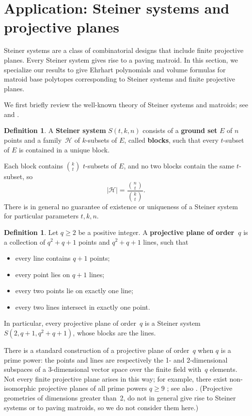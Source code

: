 \documentclass[11pt]{amsart}
\theoremstyle{definition}
\newtheorem{definition}[theorem]{Definition}
\newcommand{\0}{\emptyset}
\newcommand{\defterm}[1]{\textbf{#1}}
\newcommand{\HH}{\mathcal{H}}
\begin{document}
\section{Application: Steiner systems and projective planes} \label{subsec:steiner_systems}

Steiner systems are a class of combinatorial designs that include finite projective planes.
Every Steiner system gives rise to a paving matroid.
In this section, we specialize our results to give Ehrhart polynomials and volume formulas for matroid base polytopes corresponding to Steiner systems and finite projective planes.

We first briefly review the well-known theory of Steiner systems and matroids; see \cite[Section 6.1, Chapter 12]{Oxley} and \cite[Chapter 12]{Welsh}.

\begin{definition}
A \defterm{Steiner system} $S(t,k,n)$ consists of a \defterm{ground set} $E$ of $n$ points and a family~$\HH$ of $k$-subsets of $E$, called \defterm{blocks}, such that every $t$-subset of $E$ is contained in a unique block.
\end{definition}

Each block contains $\binom{k}{t}$ $t$-subsets of $E$, and no two blocks contain the same $t$-subset, so
\begin{equation*}\label{block_enum}
|\HH| = \frac{\binom{n}{t}}{\binom{k}{t}}.
\end{equation*}
There is in general no guarantee of existence or uniqueness of a Steiner system for particular parameters $t,k,n$.

\begin{definition}\label{def:PG}
Let $q\geq2$ be a positive integer.
A \defterm{projective plane of order~$q$} is a collection of $q^2+q+1$ points and $q^2+q+1$ lines, such that
\begin{itemize}
\item every line contains $q+1$ points;
\item every point lies on $q+1$ lines;
\item every two points lie on exactly one line;
\item every two lines intersect in exactly one point.
\end{itemize}
In particular, every projective plane of order~$q$ is a Steiner system $S(2,q+1,q^2+q+1)$, whose blocks are the lines.
\end{definition}

There is a standard construction of a projective plane of order~$q$ when $q$ is a prime power: the points and lines are respectively the 1- and 2-dimensional subspaces of a 3-dimensional vector space over the finite field with~$q$ elements.
Not every finite projective plane arises in this way; for example, there exist non-isomorphic projective planes of all prime powers $q\geq9$ \cite[p.702]{Codes}; see also \cite[\S6]{Cameron}.
(Projective geometries of dimensions greater than~2, do not in general give rise to Steiner systems or to paving matroids, so we do not consider them here.)
\end{document}
